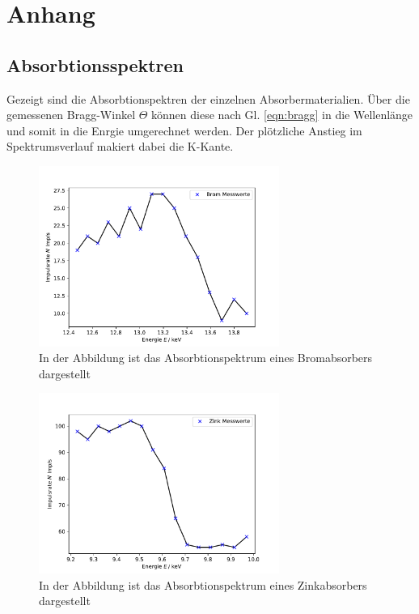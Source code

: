 \newpage
\section{Anhang}
\subsection{Absorbtionsspektren}
Gezeigt sind die Absorbtionspektren der einzelnen Absorbermaterialien.
Über die gemessenen Bragg-Winkel $\Theta$ können diese nach Gl. \ref{eqn:bragg}
in die Wellenlänge und somit in die Enrgie umgerechnet werden. Der plötzliche Anstieg
im Spektrumsverlauf makiert dabei die K-Kante.
\begin{figure}[H]
    \centering
    \includegraphics[width=0.7\textwidth]{plots/Brom.pdf}
    \caption{In der Abbildung ist das Absorbtionspektrum eines Bromabsorbers dargestellt}
\end{figure}
\begin{figure}[H]
    \centering
    \includegraphics[width=0.7\textwidth]{plots/Zink.pdf}
    \caption{In der Abbildung ist das Absorbtionspektrum eines Zinkabsorbers dargestellt}
\end{figure}
